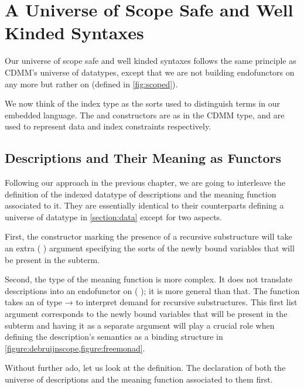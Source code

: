 \chapter{A Universe of Scope Safe and Well Kinded Syntaxes}
\label{chapter:universe}

Our universe of scope safe and well kinded syntaxes follows the same
principle as CDMM's universe of datatypes, except that we are not
building endofunctors on  any more but rather on
{ } (defined in \cref{fig:scoped}).

We now think of the index type  as the sorts used to distinguish
terms in our embedded language. The  and 
constructors are as in the CDMM  type, and are used to represent
data and index constraints respectively.

\section{Descriptions and Their Meaning as Functors}

Following our approach in the previous chapter, we are going to interleave
the definition of the indexed datatype of descriptions and the meaning
function  associated to it. They are essentially identical to
their counterparts defining a universe of datatype in \cref{section:data}
except for two aspects.

First, the constructor marking the presence of a recursive substructure
will take an extra {( )} argument specifying the sorts of
the newly bound variables that will be present in the subterm.

Second, the type of the meaning function is more complex. It does not
translate descriptions into an endofunctor on {( )};
it is more general than that. The function takes an  of type
{  →  } to interpret demand for
recursive substructures. This first list argument corresponds to the
newly bound variables that will be present in the subterm and having
it as a separate argument will play a crucial role when defining the
description's semantics as a binding structure in
\cref{figure:debruijnscope,figure:freemonad}.

Without further ado, let us look at the definition. The declaration
of both the universe of descriptions and the meaning function associated
to them first.

\begin{AgdaSuppressSpace}
\end{AgdaSuppressSpace}

